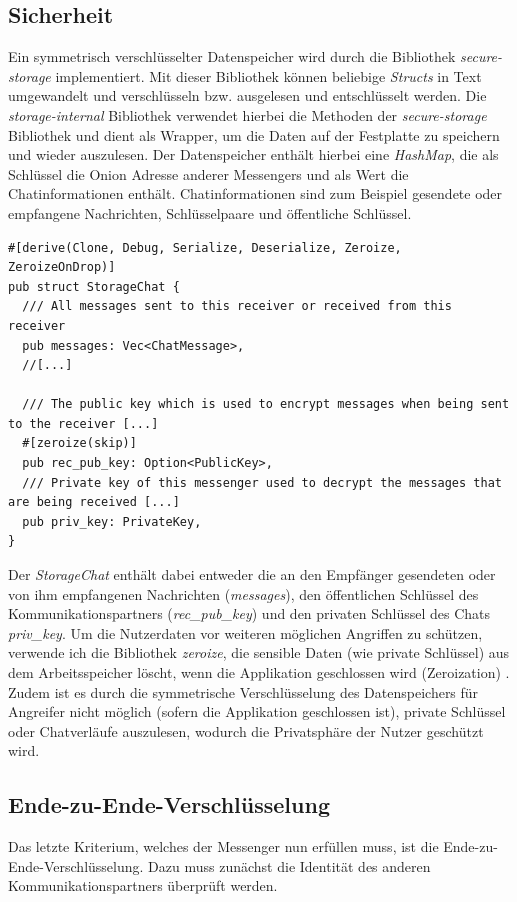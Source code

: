 \documentclass[a4paper,ngerman, headheight=28pt,12pt, footheight=27pt]{scrartcl}
\newcommand{\vcite}[1]{\cite[vgl.][]{#1}}
\begin{document}
\subsection{Sicherheit}
Ein symmetrisch verschlüsselter Datenspeicher wird durch die Bibliothek \textit{secure-storage} implementiert. Mit dieser Bibliothek können beliebige \textit{Structs} in Text umgewandelt und verschlüsseln bzw. ausgelesen und entschlüsselt werden. Die \textit{storage-internal} Bibliothek verwendet hierbei die Methoden der \textit{secure-storage} Bibliothek und dient als Wrapper, um die Daten auf der Festplatte zu speichern und wieder auszulesen. Der Datenspeicher enthält hierbei eine \textit{HashMap}, die als Schlüssel die Onion Adresse anderer Messengers und als Wert die Chatinformationen enthält. Chatinformationen sind zum Beispiel gesendete oder empfangene Nachrichten, Schlüsselpaare und öffentliche Schlüssel.
\begin{verbatim}
#[derive(Clone, Debug, Serialize, Deserialize, Zeroize, ZeroizeOnDrop)]
pub struct StorageChat {
  /// All messages sent to this receiver or received from this receiver
  pub messages: Vec<ChatMessage>,
  //[...]

  /// The public key which is used to encrypt messages when being sent to the receiver [...]
  #[zeroize(skip)]
  pub rec_pub_key: Option<PublicKey>,
  /// Private key of this messenger used to decrypt the messages that are being received [...]
  pub priv_key: PrivateKey,
}
\end{verbatim}
Der \textit{StorageChat} enthält dabei entweder die an den Empfänger gesendeten oder von ihm empfangenen Nachrichten (\textit{messages}), den öffentlichen Schlüssel des Kommunikationspartners (\textit{rec\_pub\_key}) und den privaten Schlüssel des Chats \textit{priv\_key}.
Um die Nutzerdaten vor weiteren möglichen Angriffen zu schützen, verwende ich die Bibliothek \textit{zeroize}, die sensible Daten (wie private Schlüssel) aus dem Arbeitsspeicher löscht, wenn die Applikation geschlossen wird (Zeroization) \vcite{Zeroization}. Zudem ist es durch die symmetrische Verschlüsselung des Datenspeichers für Angreifer nicht möglich (sofern die Applikation geschlossen ist), private Schlüssel oder Chatverläufe auszulesen, wodurch die Privatsphäre der Nutzer geschützt wird.

\subsection{Ende-zu-Ende-Verschlüsselung}
Das letzte Kriterium, welches der Messenger nun erfüllen muss, ist die Ende-zu-Ende-Verschlüsselung. Dazu muss zunächst die Identität des anderen Kommunikationspartners überprüft werden.
\end{document}
